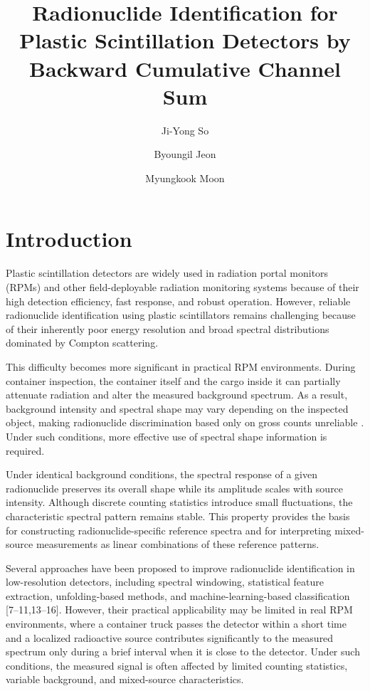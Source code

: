 \documentclass[10pt]{wlscirep}
\title{Radionuclide Identification for Plastic Scintillation Detectors by Backward Cumulative Channel Sum}
\author[1]{Ji-Yong So}
\author[2]{Byoungil Jeon}
\author[1,*]{Myungkook Moon}
\affil[1]{Korea Atomic Energy Research Institute, Neutron Science Division, Daejeon, 34057, Korea}
\affil[2]{Korea Atomic Energy Research Institute, Applied Artificial Intelligence Section, Daejeon, 34057, Korea}
\affil[*]{moonmk@kaeri.re.kr}
\begin{document}
\flushbottom
\maketitle

\thispagestyle{empty}


\section*{Introduction}

Plastic scintillation detectors are widely used in radiation portal monitors (RPMs) and other
field-deployable radiation monitoring systems because of their high detection efficiency, fast response, and robust operation\cite{Sicilliano2005Comparision, Bertrand2014Current,Ely2006TheUse,Hevener2013EWindow}. However, reliable radionuclide identification using plastic scintillators remains challenging because of their inherently poor energy resolution and broad spectral distributions dominated by Compton scattering\cite{Hevener2013EWindow, Lee2020Radioisotope, Paff2017Spectral,Runkle2006Analysis}. 

This difficulty becomes more significant in practical RPM environments. During container inspection, the container itself and the cargo inside it can partially attenuate radiation and alter the measured background spectrum. As a result, background intensity and spectral shape may vary depending on the inspected object, making radionuclide discrimination based only on gross counts unreliable \cite{Lee2020Radioisotope, Paff2017Spectral,Runkle2006Analysis,Kim2019InvMat}. Under such conditions, more effective use of spectral shape information is required.

Under identical background conditions, the spectral response of a given radionuclide preserves its overall shape while its amplitude scales with source intensity. Although discrete counting statistics introduce small fluctuations, the characteristic spectral pattern remains stable. This property provides the basis for constructing radionuclide-specific reference spectra and for interpreting mixed-source measurements as linear combinations of these reference patterns.

Several approaches have been proposed to improve radionuclide identification in low-resolution detectors, including spectral windowing, statistical feature extraction, unfolding-based methods, and machine-learning-based classification [7–11,13–16]. However, their practical applicability may be limited in real RPM environments, where a container truck passes the detector within a short time and a localized radioactive source contributes significantly to the measured spectrum only during a brief interval when it is close to the detector. Under such conditions, the measured signal is often affected by limited counting statistics, variable background, and mixed-source characteristics.
\end{document}
